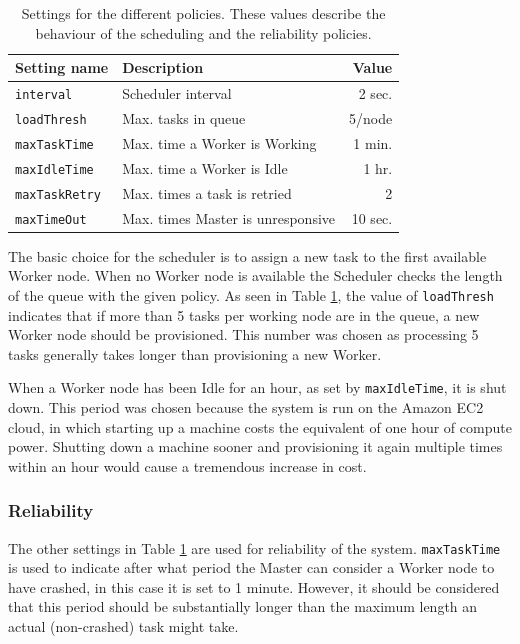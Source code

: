 \documentclass{acm_proc_article-sp}
\begin{document}
\begin{table}[]
	\begin{tabular}{| l | l | r |}
		\hline
		Setting name & Description & Value \\ \hline \hline
		\texttt{interval} & Scheduler interval & 2 sec. \\ \hline
		\texttt{loadThresh} & Max. tasks in queue & 5/node \\ \hline
		\texttt{maxTaskTime} & Max. time a Worker is Working & 1 min. \\ \hline
		\texttt{maxIdleTime} & Max. time a Worker is Idle & 1 hr. \\ \hline
		\texttt{maxTaskRetry} & Max. times a task is retried & 2 \\ \hline
		\texttt{maxTimeOut} & Max. times Master is unresponsive & 10 sec. \\ \hline
	\end{tabular}
	\caption{Settings for the different policies. These values describe the behaviour of the scheduling and the reliability policies.}
	\label{tbl:policy}
\end{table}

The basic choice for the scheduler is to assign a new task to the first available Worker node.
When no Worker node is available the Scheduler checks the length of the queue with the given policy.
As seen in Table \ref{tbl:policy}, the value of \texttt{loadThresh} indicates that if more than 5 tasks per working node are in the queue, a new Worker node should be provisioned.
This number was chosen as processing 5 tasks generally takes longer than provisioning a new Worker.

When a Worker node has been Idle for an hour, as set by \texttt{maxIdleTime}, it is shut down.
This period was chosen because the system is run on the Amazon EC2 cloud, in which starting up a machine costs the equivalent of one hour of compute power.
Shutting down a machine sooner and provisioning it again multiple times within an hour would cause a tremendous increase in cost.

\subsubsection{Reliability}
The other settings in Table \ref{tbl:policy} are used for reliability of the system.
\texttt{maxTaskTime} is used to indicate after what period the Master can consider a Worker node to have crashed, in this case it is set to 1 minute.
However, it should be considered that this period should be substantially longer than the maximum length an actual (non-crashed) task might take.
\end{document}
